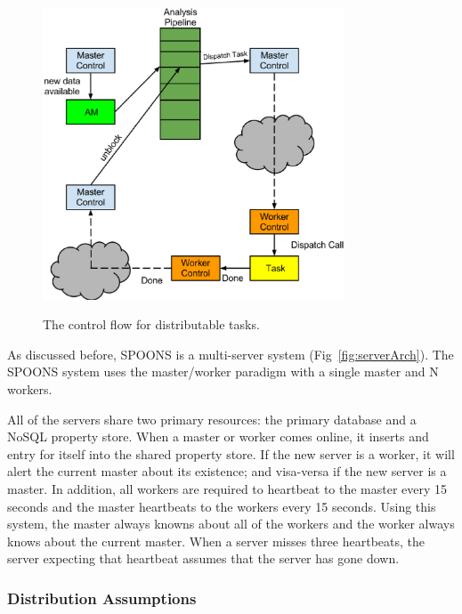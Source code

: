 \documentclass[12pt]{ucthesis}
\newcommand{\captionfonts}{\small\bf\ssp}
\begin{document}
\begin{figure}
   \begin{center}
      \includegraphics[width=0.8\textwidth]{images/SPOONS_Distributable_Task_Control_Flow.eps}
      \captionfonts
      \caption[SPOONS Distributable Task Flow]{The control flow for distributable tasks.}
      \label{fig:taskFlow}
   \end{center}
\end{figure}

As discussed before, SPOONS is a multi-server system (Fig~\ref{fig:serverArch}).
The SPOONS system uses the master/worker paradigm with a single master and N workers.

All of the servers share two primary resources: the primary database and a NoSQL property store.
When a master or worker comes online, it inserts and entry for itself into the shared property store.
If the new server is a worker, it will alert the current master about its existence; and visa-versa
if the new server is a master. In addition, all workers are required to heartbeat to the master every
15 seconds and the master heartbeats to the workers every 15 seconds. Using this system, the master
always knowns about all of the workers and the worker always knows about the current master.
When a server misses three heartbeats, the server expecting that heartbeat assumes that the server has
gone down.

\subsubsection{Distribution Assumptions}
\label{arch-dist-assumptions}
\end{document}
